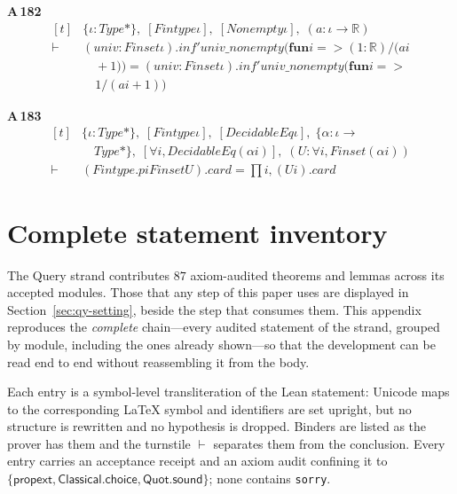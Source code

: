 \noindent\textbf{A\,182}\quad{}
{\footnotesize\[ \begin{aligned}[t]
&\{ \iota : \mathit{Type}*\},\; [\mathit{Fintype} \iota ],\; [\mathit{Nonempty} \iota ],\; (\mathit{a} : \iota \to \mathbb{R} )\\
\vdash\;&(\mathit{univ} : \mathit{Finset} \iota ).\mathit{inf'} \mathit{univ\_nonempty} (\mathbf{fun} \mathit{i} => (1:\mathbb{R} )/(\mathit{a} \mathit{i}\\
&\quad + 1)) = (\mathit{univ} : \mathit{Finset} \iota ).\mathit{inf'} \mathit{univ\_nonempty} (\mathbf{fun} \mathit{i} =>\\
&\quad 1/(\mathit{a} \mathit{i} + 1))
\end{aligned} \]}

\noindent\textbf{A\,183}\quad{}
{\footnotesize\[ \begin{aligned}[t]
&\{ \iota : \mathit{Type}*\},\; [\mathit{Fintype} \iota ],\; [\mathit{DecidableEq} \iota ],\; \{ \alpha : \iota \to\\
&\quad \mathit{Type}*\},\; [\forall \mathit{i}, \mathit{DecidableEq} (\alpha \mathit{i})],\; (\mathit{U} : \forall \mathit{i}, \mathit{Finset} (\alpha \mathit{i}))\\
\vdash\;&(\mathit{Fintype}.\mathit{piFinset} \mathit{U}).\mathit{card} = \textstyle\prod \mathit{i}, (\mathit{U} \mathit{i}).\mathit{card}
\end{aligned} \]}

\section{Complete statement inventory}
\label{app:qy-inventory}

The Query strand contributes $87$ axiom-audited theorems and lemmas across its accepted modules. Those that any step of this paper uses are displayed in Section~\ref{sec:qy-setting}, beside the step that consumes them. This appendix reproduces the \emph{complete} chain---every audited statement of the strand, grouped by module, including the ones already shown---so that the development can be read end to end without reassembling it from the body.

Each entry is a symbol-level transliteration of the Lean statement: Unicode maps to the corresponding \LaTeX{} symbol and identifiers are set upright, but no structure is rewritten and no hypothesis is dropped. Binders are listed as the prover has them and the turnstile $\vdash$ separates them from the conclusion. Every entry carries an acceptance receipt and an axiom audit confining it to $\{\textsf{propext},\textsf{Classical.choice},\textsf{Quot.sound}\}$; none contains \texttt{sorry}.

